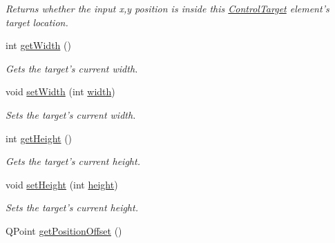 \begin{DoxyCompactItemize}
\begin{DoxyCompactList}\small\item\em Returns whether the input x,y position is inside this \hyperlink{class_picto_1_1_control_target}{Control\-Target} element's target location. \end{DoxyCompactList}\item 
\hypertarget{class_picto_1_1_rect_target_ab758819b469c04d52f75d6374ada0ba6}{int \hyperlink{class_picto_1_1_rect_target_ab758819b469c04d52f75d6374ada0ba6}{get\-Width} ()}\label{class_picto_1_1_rect_target_ab758819b469c04d52f75d6374ada0ba6}

\begin{DoxyCompactList}\small\item\em Gets the target's current width. \end{DoxyCompactList}\item 
\hypertarget{class_picto_1_1_rect_target_a2b9f1da357ed6eebdd287b11673eb8d0}{void \hyperlink{class_picto_1_1_rect_target_a2b9f1da357ed6eebdd287b11673eb8d0}{set\-Width} (int \hyperlink{class_picto_1_1_rect_target_a606a7d78590ab568c0181fce1b3e9a5d}{width})}\label{class_picto_1_1_rect_target_a2b9f1da357ed6eebdd287b11673eb8d0}

\begin{DoxyCompactList}\small\item\em Sets the target's current width. \end{DoxyCompactList}\item 
\hypertarget{class_picto_1_1_rect_target_ae9349f37823d905c1b713bafcf9116de}{int \hyperlink{class_picto_1_1_rect_target_ae9349f37823d905c1b713bafcf9116de}{get\-Height} ()}\label{class_picto_1_1_rect_target_ae9349f37823d905c1b713bafcf9116de}

\begin{DoxyCompactList}\small\item\em Gets the target's current height. \end{DoxyCompactList}\item 
\hypertarget{class_picto_1_1_rect_target_ad2acf86767321cca9a32308e3a9dac93}{void \hyperlink{class_picto_1_1_rect_target_ad2acf86767321cca9a32308e3a9dac93}{set\-Height} (int \hyperlink{class_picto_1_1_rect_target_a8617cd6f4cd1fd36b8006c4e44df6641}{height})}\label{class_picto_1_1_rect_target_ad2acf86767321cca9a32308e3a9dac93}

\begin{DoxyCompactList}\small\item\em Sets the target's current height. \end{DoxyCompactList}\item 
\hypertarget{class_picto_1_1_rect_target_af23bf52263c2d2ac99b768b16ae2cde1}{Q\-Point \hyperlink{class_picto_1_1_rect_target_af23bf52263c2d2ac99b768b16ae2cde1}{get\-Position\-Offset} ()}\label{class_picto_1_1_rect_target_af23bf52263c2d2ac99b768b16ae2cde1}


\end{DoxyCompactItemize}
